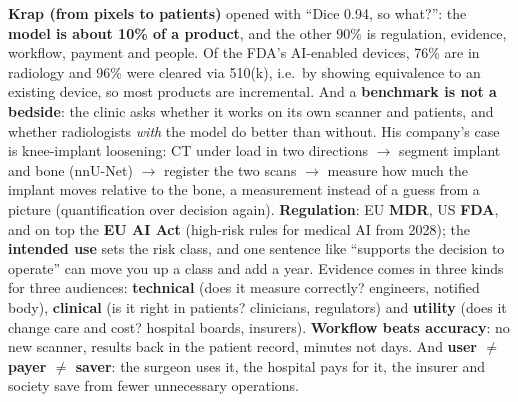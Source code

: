 \documentclass[a4paper]{article}
\newcommand{\K}[1]{\textcolor{kg}{\textbf{#1}}}
\newcommand{\E}[1]{\textcolor{ep}{#1}}
\newcommand{\ra}{\ensuremath{\to}}
\begin{document}
\textbf{Krap (from pixels to patients)} opened with \E{``Dice 0.94, so what?''}: the \K{model is about 10\% of a product}, and the other 90\% is regulation, evidence, workflow, payment and people. Of the FDA's AI-enabled devices, \E{76\% are in radiology and 96\% were cleared via 510(k)}, i.e.\ by showing equivalence to an existing device, so most products are incremental. And a \K{benchmark is not a bedside}: the clinic asks whether it works on its own scanner and patients, and whether radiologists \emph{with} the model do better than without. His company's case is knee-implant loosening: \E{CT under load in two directions \ra{} segment implant and bone (nnU-Net) \ra{} register the two scans \ra{} measure how much the implant moves relative to the bone}, a measurement instead of a guess from a picture (quantification over decision again). \K{Regulation}: EU \K{MDR}, US \K{FDA}, and on top the \K{EU AI Act} (high-risk rules for medical AI from 2028); the \K{intended use} sets the risk class, and one sentence like ``supports the decision to operate'' can move you up a class and add a year. Evidence comes in three kinds for three audiences: \K{technical} (does it measure correctly? engineers, notified body), \K{clinical} (is it right in patients? clinicians, regulators) and \K{utility} (does it change care and cost? hospital boards, insurers). \K{Workflow beats accuracy}: no new scanner, results back in the patient record, minutes not days. And \K{user $\neq$ payer $\neq$ saver}: the surgeon uses it, the hospital pays for it, the insurer and society save from fewer unnecessary operations.
\end{document}
